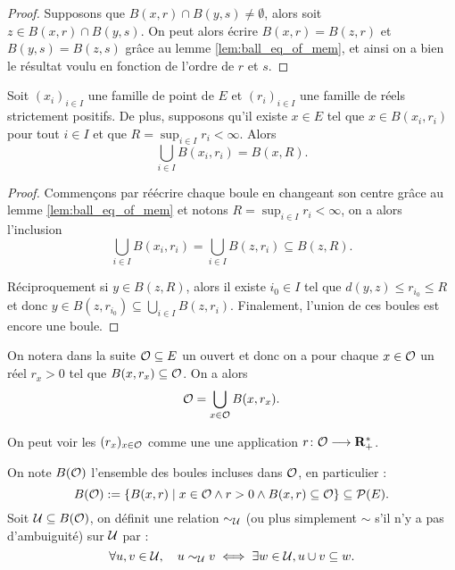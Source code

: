 \documentclass[../../rapport.tex]{subfiles}
\begin{document}
  \begin{proof}
    Supposons que $B(x, r) \cap B(y, s) \not= \emptyset$, alors soit $z \in B(x, r) \cap B(y, s)$.
    On peut alors écrire $B(x, r) = B(z, r)$ et $B(y, s) = B(z, s)$ grâce au lemme \ref{lem:ball_eq_of_mem},
    et ainsi on a bien le résultat voulu en fonction de l'ordre de $r$ et $s$.
  \end{proof}

  \begin{lemma}
    Soit $(x_i)_{i\in I}$ une famille de point de $E$ et $(r_i)_{i\in I}$ une famille de réels strictement positifs.
    De plus, supposons qu'il existe $x \in E$ tel que $x \in B(x_i, r_i)$ pour tout $i \in I$ et que $R = \sup_{i\in I}{r_i} < \infty$.
    Alors
    $$\bigcup_{i \in I}B(x_i, r_i) = B(x, R).$$
  \end{lemma}

  \begin{proof}
    Commençons par réécrire chaque boule en changeant son centre grâce au lemme \ref{lem:ball_eq_of_mem} et
    notons $R = \sup_{i\in I}{r_i} < \infty$, on a alors l'inclusion
    $$\bigcup_{i\in I}B(x_i, r_i) = \bigcup_{i\in I}{B(z, r_i)} \subseteq B(z, R).$$

    Réciproquement si $y \in B(z, R)$, alors il existe $i_0 \in I$ tel que $d(y, z) \le r_{i_0} \le R$
    et donc $y \in B(z, r_{i_0}) \subseteq \bigcup_{i\in I}{B(z, r_i)}$.
    Finalement, l'union de ces boules est encore une boule.
  \end{proof}

  On notera dans la suite $\mathcal{O} \subseteq E$ un ouvert et donc on a pour chaque $x \in \mathcal{O}$ un réel $r_x > 0$ tel que
  $B(x, r_x) \subseteq \mathcal{O}$. On a alors
  $$\mathcal{O} = \bigcup_{x\in\mathcal{O}}{B(x, r_x)}.$$

  \begin{remark}
    On peut voir les $(r_x)_{x\in\mathcal{O}}$ comme une une application $r \colon \mathcal{O} \longrightarrow \mathbf R^*_+$.
  \end{remark}

  \begin{definition}
    On note $B(\mathcal{O})$ l'ensemble des boules incluses dans $\mathcal{O}$, en particulier :
    $$B(\mathcal{O}) := \left\{B(x, r) \mid x \in \mathcal{O} \land r > 0 \land B(x, r) \subseteq \mathcal{O}\right\} \subseteq \mathcal{P}(E).$$
    Soit $\mathcal U \subseteq B(\mathcal{O})$, on définit une relation $\sim_{\mathcal U}$ (ou plus simplement $\sim$ s'il n'y a pas d'ambuiguité) sur $\mathcal U$ par :
    $$\forall u, v \in \mathcal U, \hspace{1em} u \sim_{\mathcal U} v \iff \exists w \in \mathcal U, u \cup v \subseteq w.$$
  \end{definition}
\end{document}
